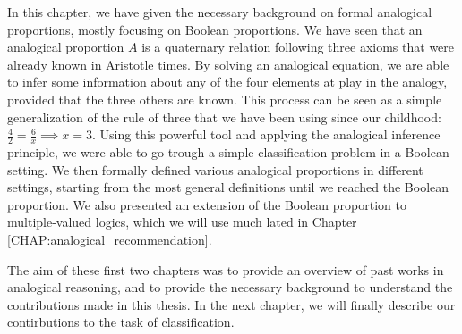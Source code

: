In this chapter, we have given the necessary background on formal analogical
proportions, mostly focusing on Boolean proportions. We have seen that an
analogical proportion $A$ is a quaternary relation following three axioms that
were already known in Aristotle times. By solving an analogical equation, we
are able to infer some information about any of the four elements at play in
the analogy, provided that the three others are known. This process can be seen
as a simple generalization of the rule of three that we have been using since
our childhood: $\frac{4}{2} = \frac{6}{x} \implies x = 3$. Using this powerful
tool and applying the analogical inference principle, we were able to go trough
a simple classification problem in a Boolean setting. We then formally defined
various analogical proportions in different settings, starting from the most
general definitions until we reached the Boolean proportion. We also presented
an extension of the Boolean proportion to multiple-valued logics, which we will
use much lated in Chapter \ref{CHAP:analogical_recommendation}.

The aim of these first two chapters was to provide an overview of past works in
analogical reasoning, and to provide the necessary background to understand the
contributions made in this thesis. In the next chapter, we will finally
describe our contirbutions to the task of classification.

